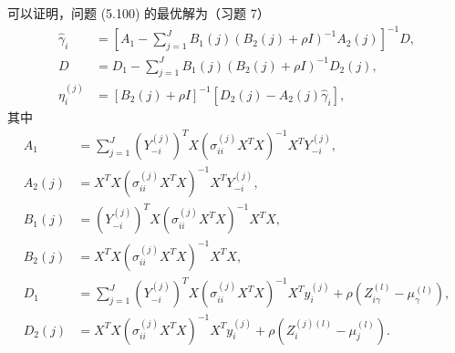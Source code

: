 可以证明，问题 (5.100) 的最优解为（习题 7）
\begin{equation}
\begin{aligned}
\widehat\gamma_i&=\left[A_1-\sum_{j=1}^JB_1(j)(B_2(j)+\rho I)^{-1}A_2(j)\right]^{-1}D,\\
D&=D_1-\sum_{j=1}^JB_1(j)(B_2(j)+\rho I)^{-1}D_2(j),\\
\eta_i^{(j)}&=[B_2(j)+\rho I]^{-1}[D_2(j)-A_2(j)\widehat\gamma_i],
\end{aligned}
\tag{5.103}
\end{equation}
其中
\[
\begin{aligned}
A_1&=\sum_{j=1}^J(Y_{-i}^{(j)})^TX(\sigma_{ii}^{(j)}X^TX)^{-1}X^TY_{-i}^{(j)},\\
A_2(j)&=X^TX(\sigma_{ii}^{(j)}X^TX)^{-1}X^TY_{-i}^{(j)},\\
B_1(j)&=(Y_{-i}^{(j)})^TX(\sigma_{ii}^{(j)}X^TX)^{-1}X^TX,\\
B_2(j)&=X^TX(\sigma_{ii}^{(j)}X^TX)^{-1}X^TX,\\
D_1&=\sum_{j=1}^J(Y_{-i}^{(j)})^TX(\sigma_{ii}^{(j)}X^TX)^{-1}X^Ty_i^{(j)}
+\rho(Z_{i\gamma}^{(l)}-\mu_\gamma^{(l)}),\\
D_2(j)&=X^TX(\sigma_{ii}^{(j)}X^TX)^{-1}X^Ty_i^{(j)}
+\rho(Z_i^{(j)(l)}-\mu_j^{(l)}).
\end{aligned}
\]


